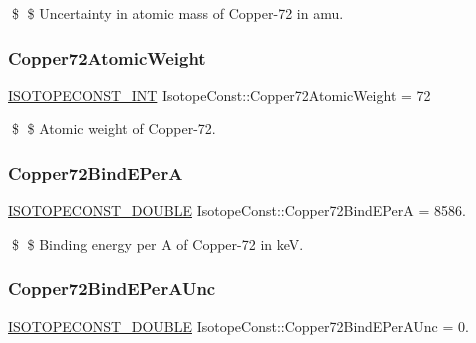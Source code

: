 \$ \$ Uncertainty in atomic mass of Copper-\/72 in amu. \mbox{\label{group___isotope_const-_copper-_cu72_ga8475b4b316e0f644f5486397279ed066}} 
\subsubsection{\texorpdfstring{Copper72\+Atomic\+Weight}{Copper72AtomicWeight}}
{\footnotesize\ttfamily \mbox{\hyperlink{group___isotope_const-_macros_ga5f18360b3e99483a35c32d789e62621c}{I\+S\+O\+T\+O\+P\+E\+C\+O\+N\+S\+T\+\_\+\+I\+NT}} Isotope\+Const\+::\+Copper72\+Atomic\+Weight = 72}

\$ \$ Atomic weight of Copper-\/72. \mbox{\label{group___isotope_const-_copper-_cu72_ga2d681ca70d3624ccd82544d66108ddb8}} 
\subsubsection{\texorpdfstring{Copper72\+Bind\+E\+PerA}{Copper72BindEPerA}}
{\footnotesize\ttfamily \mbox{\hyperlink{group___isotope_const-_macros_ga8f45a7272ce02c0b4c65c44636ed719a}{I\+S\+O\+T\+O\+P\+E\+C\+O\+N\+S\+T\+\_\+\+D\+O\+U\+B\+LE}} Isotope\+Const\+::\+Copper72\+Bind\+E\+PerA = 8586.}

\$ \$ Binding energy per A of Copper-\/72 in keV. \mbox{\label{group___isotope_const-_copper-_cu72_ga82597aca7364671a70ecab1f4a7dcb3f}} 
\subsubsection{\texorpdfstring{Copper72\+Bind\+E\+Per\+A\+Unc}{Copper72BindEPerAUnc}}
{\footnotesize\ttfamily \mbox{\hyperlink{group___isotope_const-_macros_ga8f45a7272ce02c0b4c65c44636ed719a}{I\+S\+O\+T\+O\+P\+E\+C\+O\+N\+S\+T\+\_\+\+D\+O\+U\+B\+LE}} Isotope\+Const\+::\+Copper72\+Bind\+E\+Per\+A\+Unc = 0.}

